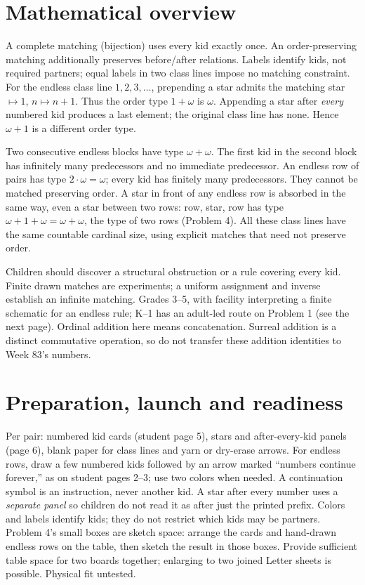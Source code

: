 \documentclass[11pt,letterpaper]{article}
\begin{document}
\section*{Mathematical overview}
A complete matching (bijection) uses every kid exactly once. An order-preserving matching additionally preserves before/after relations. Labels identify kids, not required partners; equal labels in two class lines impose no matching constraint. For the endless class line $1,2,3,\ldots$, prepending a star admits the matching star$\mapsto1$, $n\mapsto n+1$. Thus the order type $1+\omega$ is $\omega$. Appending a star after \emph{every} numbered kid produces a last element; the original class line has none. Hence $\omega+1$ is a different order type.

Two consecutive endless blocks have type $\omega+\omega$. The first kid in the second block has infinitely many predecessors and no immediate predecessor. An endless row of pairs has type $2\cdot\omega=\omega$; every kid has finitely many predecessors. They cannot be matched preserving order. A star in front of any endless row is absorbed in the same way, even a star between two rows: row, star, row has type $\omega+1+\omega=\omega+\omega$, the type of two rows (Problem 4). All these class lines have the same countable cardinal size, using explicit matches that need not preserve order.

Children should discover a structural obstruction or a rule covering every kid. Finite drawn matches are experiments; a uniform assignment and inverse establish an infinite matching. Grades 3--5, with facility interpreting a finite schematic for an endless rule; K--1 has an adult-led route on Problem 1 (see the next page). Ordinal addition here means concatenation. Surreal addition is a distinct commutative operation, so do not transfer these addition identities to Week 83's numbers.
\newpage
\section*{Preparation, launch and readiness}
Per pair: numbered kid cards (student page 5), stars and after-every-kid panels (page 6), blank paper for class lines and yarn or dry-erase arrows. For endless rows, draw a few numbered kids followed by an arrow marked ``numbers continue forever,'' as on student pages 2--3; use two colors when needed. A continuation symbol is an instruction, never another kid. A star after every number uses a \emph{separate panel} so children do not read it as after just the printed prefix. Colors and labels identify kids; they do not restrict which kids may be partners. Problem 4's small boxes are sketch space: arrange the cards and hand-drawn endless rows on the table, then sketch the result in those boxes. Provide sufficient table space for two boards together; enlarging to two joined Letter sheets is possible. Physical fit untested.
\end{document}

